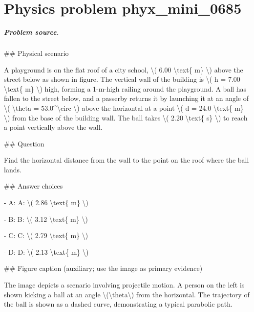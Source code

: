 
\chapter{Physics problem phyx\_mini\_0685}
\label{ch:PhyXMiniProblems_problem_phyx_mini_0685}

\paragraph{Problem source.}
\#\# Physical scenario

A playground is on the flat roof of a city school, \textbackslash{}( 6.00 \textbackslash{}text\{ m\} \textbackslash{}) above the street below as shown in figure. The vertical wall of the building is \textbackslash{}( h = 7.00 \textbackslash{}text\{ m\} \textbackslash{}) high, forming a 1-m-high railing around the playground. A ball has fallen to the street below, and a passerby returns it by launching it at an angle of \textbackslash{}( \textbackslash{}theta = 53.0\textasciicircum{}\textbackslash{}circ \textbackslash{}) above the horizontal at a point \textbackslash{}( d = 24.0 \textbackslash{}text\{ m\} \textbackslash{}) from the base of the building wall. The ball takes \textbackslash{}( 2.20 \textbackslash{}text\{ s\} \textbackslash{}) to reach a point vertically above the wall.

\#\# Question

Find the horizontal distance from the wall to the point on the roof where the ball lands.

\#\# Answer choices

- A: A: \textbackslash{}( 2.86 \textbackslash{}text\{ m\} \textbackslash{})

- B: B: \textbackslash{}( 3.12 \textbackslash{}text\{ m\} \textbackslash{})

- C: C: \textbackslash{}( 2.79 \textbackslash{}text\{ m\} \textbackslash{})

- D: D: \textbackslash{}( 2.13 \textbackslash{}text\{ m\} \textbackslash{})

\#\# Figure caption (auxiliary; use the image as primary evidence)

The image depicts a scenario involving projectile motion. A person on the left is shown kicking a ball at an angle \textbackslash{}(\textbackslash{}theta\textbackslash{}) from the horizontal. The trajectory of the ball is shown as a dashed curve, demonstrating a typical parabolic path. 

